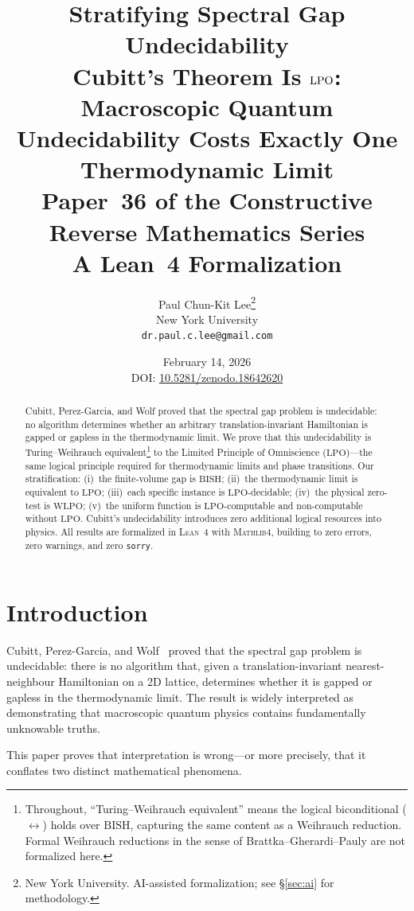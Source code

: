 \documentclass[11pt,a4paper]{article}
\title{%
  \textbf{Stratifying Spectral Gap Undecidability}\\[6pt]
  {\normalsize Cubitt's Theorem Is $\LPO$: Macroscopic Quantum Undecidability
  Costs Exactly One Thermodynamic Limit}\\[6pt]
  {\normalsize Paper~36 of the Constructive Reverse Mathematics Series}\\[4pt]
  {\normalsize A Lean~4 Formalization}%
}
\author{
  Paul Chun-Kit Lee\thanks{%
    New York University.
    AI-assisted formalization; see \S\ref{sec:ai} for methodology.} \\
  New York University \\
  \texttt{dr.paul.c.lee@gmail.com}
}
\date{February 14, 2026\\[4pt]
  {\small DOI: \href{https://doi.org/10.5281/zenodo.18642620}{10.5281/zenodo.18642620}}}
\theoremstyle{plain}
\theoremstyle{definition}
\newcommand{\LPO}{\ensuremath{\mathrm{LPO}}}
\newcommand{\WLPO}{\ensuremath{\mathrm{WLPO}}}
\newcommand{\BISH}{\ensuremath{\mathrm{BISH}}}
\newcommand{\Lean}{\textsc{Lean~4}}
\newcommand{\Mathlib}{\textsc{Mathlib4}}
\begin{document}
\maketitle

\begin{abstract}
Cubitt, Perez-Garcia, and Wolf proved that the spectral gap problem
is undecidable: no algorithm determines whether an arbitrary
translation-invariant Hamiltonian is gapped or gapless in the
thermodynamic limit. We prove that this undecidability is
Turing--Weihrauch equivalent\footnote{Throughout, ``Turing--Weihrauch
equivalent'' means the logical biconditional ($\leftrightarrow$)
holds over $\BISH$, capturing the same content as a Weihrauch
reduction. Formal Weihrauch reductions in the sense of
Brattka--Gherardi--Pauly are not formalized here.}
to the Limited Principle of Omniscience
($\LPO$)---the same logical principle required for thermodynamic
limits and phase transitions. Our stratification:
(i)~the finite-volume gap is $\BISH$;
(ii)~the thermodynamic limit is equivalent to $\LPO$;
(iii)~each specific instance is $\LPO$-decidable;
(iv)~the physical zero-test is $\WLPO$;
(v)~the uniform function is $\LPO$-computable and non-computable
without $\LPO$. Cubitt's undecidability introduces zero additional
logical resources into physics. All results are formalized in
\Lean{} with \Mathlib{}, building to zero errors, zero warnings,
and zero \texttt{sorry}.
\end{abstract}

\tableofcontents

\section{Introduction}\label{sec:intro}

Cubitt, Perez-Garcia, and Wolf~\cite{cubitt2015} proved that the
spectral gap problem is undecidable: there is no algorithm that,
given a translation-invariant nearest-neighbour Hamiltonian on a 2D
lattice, determines whether it is gapped or gapless in the
thermodynamic limit. The result is widely interpreted as demonstrating
that macroscopic quantum physics contains fundamentally unknowable
truths.

This paper proves that interpretation is wrong---or more precisely,
that it conflates two distinct mathematical phenomena.
\end{document}
